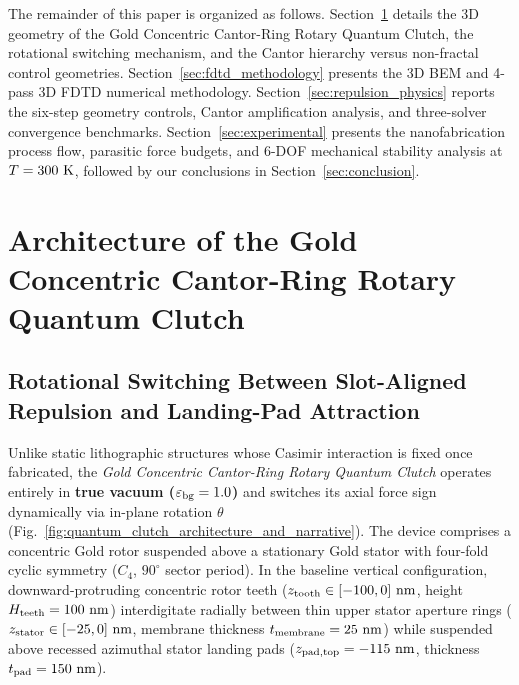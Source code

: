 \documentclass[11pt,letterpaper]{article}
\begin{document}
The remainder of this paper is organized as follows. Section~\ref{sec:architecture} details the 3D geometry of the Gold Concentric Cantor-Ring Rotary Quantum Clutch, the rotational switching mechanism, and the Cantor hierarchy versus non-fractal control geometries. Section~\ref{sec:fdtd_methodology} presents the 3D BEM and 4-pass 3D FDTD numerical methodology. Section~\ref{sec:repulsion_physics} reports the six-step geometry controls, Cantor amplification analysis, and three-solver convergence benchmarks. Section~\ref{sec:experimental} presents the nanofabrication process flow, parasitic force budgets, and 6-DOF mechanical stability analysis at $T = 300{}\text{ K}$, followed by our conclusions in Section~\ref{sec:conclusion}.


\section{Architecture of the Gold Concentric Cantor-Ring Rotary Quantum Clutch}
\label{sec:architecture}

\subsection{Rotational Switching Between Slot-Aligned Repulsion and Landing-Pad Attraction}

Unlike static lithographic structures whose Casimir interaction is fixed once fabricated, the \emph{Gold Concentric Cantor-Ring Rotary Quantum Clutch} operates entirely in \textbf{true vacuum ($\varepsilon_{\rm bg}=1.0$)} and switches its axial force sign dynamically via in-plane rotation $\theta$ (Fig.~\ref{fig:quantum_clutch_architecture_and_narrative}). The device comprises a concentric Gold rotor suspended above a stationary Gold stator with four-fold cyclic symmetry ($C_4$, $90^\circ$ sector period). In the baseline vertical configuration, downward-protruding concentric rotor teeth ($z_{\rm tooth} \in [-100, 0]\text{ nm}$, height $H_{\rm teeth} = 100\text{ nm}$) interdigitate radially between thin upper stator aperture rings ($z_{\rm stator} \in [-25, 0]\text{ nm}$, membrane thickness $t_{\rm membrane} = 25\text{ nm}$) while suspended above recessed azimuthal stator landing pads ($z_{\rm pad,top} = -115\text{ nm}$, thickness $t_{\rm pad} = 150\text{ nm}$).
\end{document}
